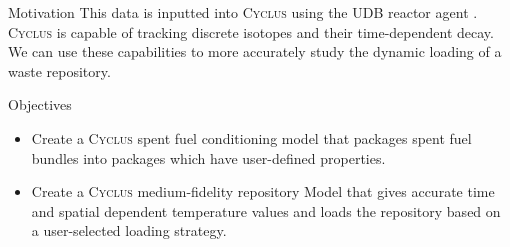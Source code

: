 \documentclass[final]{beamer}
\newlength{\onecolwid}
\newlength{\threecolwid}
\newcommand{\Cyclus}{\textsc{Cyclus}\xspace}%
\begin{document}
\begin{frame}[t]
\begin{columns}[t,totalwidth=\threecolwid]
\begin{column}{\onecolwid}
\begin{block}{Motivation}
This data is inputted into \Cyclus using the UDB reactor agent \cite{}. 
\Cyclus is capable of tracking discrete isotopes and their time-dependent decay. 
We can use these capabilities to more accurately study the dynamic loading 
of a waste repository. 

\end{block}

\begin{alertblock}{Objectives}
\begin{itemize}
        \item Create a \Cyclus spent fuel conditioning model that packages spent fuel 
        bundles into packages which have user-defined properties. 
		\item Create a \Cyclus medium-fidelity repository Model that gives accurate 
		time and spatial dependent temperature values and loads the repository
		based on a user-selected loading strategy. 
\end{itemize}

\end{alertblock}



\end{column}
\end{columns}
\end{frame}
\end{document}
